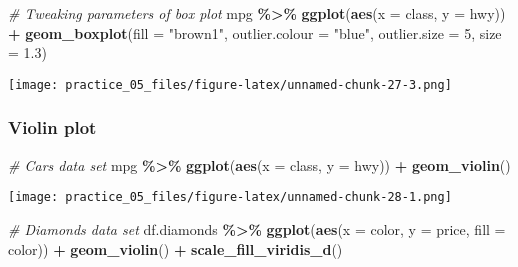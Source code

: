 \documentclass[
]{article}
\newenvironment{Shaded}{\begin{snugshade}}{\end{snugshade}}
\newcommand{\AttributeTok}[1]{\textcolor[rgb]{0.13,0.29,0.53}{#1}}
\newcommand{\CommentTok}[1]{\textcolor[rgb]{0.56,0.35,0.01}{\textit{#1}}}
\newcommand{\DecValTok}[1]{\textcolor[rgb]{0.00,0.00,0.81}{#1}}
\newcommand{\FloatTok}[1]{\textcolor[rgb]{0.00,0.00,0.81}{#1}}
\newcommand{\FunctionTok}[1]{\textcolor[rgb]{0.13,0.29,0.53}{\textbf{#1}}}
\newcommand{\NormalTok}[1]{#1}
\newcommand{\SpecialCharTok}[1]{\textcolor[rgb]{0.81,0.36,0.00}{\textbf{#1}}}
\newcommand{\StringTok}[1]{\textcolor[rgb]{0.31,0.60,0.02}{#1}}
\begin{document}
\begin{Shaded}
\begin{Highlighting}[]
\CommentTok{\# Tweaking parameters of box plot}
\NormalTok{  mpg }\SpecialCharTok{\%\textgreater{}\%} 
    \FunctionTok{ggplot}\NormalTok{(}\FunctionTok{aes}\NormalTok{(}\AttributeTok{x =}\NormalTok{ class,}
               \AttributeTok{y =}\NormalTok{ hwy)) }\SpecialCharTok{+}
    \FunctionTok{geom\_boxplot}\NormalTok{(}\AttributeTok{fill =} \StringTok{"brown1"}\NormalTok{, }
                 \AttributeTok{outlier.colour =} \StringTok{"blue"}\NormalTok{, }
                 \AttributeTok{outlier.size =} \DecValTok{5}\NormalTok{,}
                 \AttributeTok{size =} \FloatTok{1.3}\NormalTok{)}
\end{Highlighting}
\end{Shaded}

\texttt{[image: practice\_05\_files/figure-latex/unnamed-chunk-27-3.png]}

\subsubsection{Violin plot}\label{violin-plot}

\begin{Shaded}
\begin{Highlighting}[]
\CommentTok{\# Cars data set  }
\NormalTok{mpg }\SpecialCharTok{\%\textgreater{}\%}
  \FunctionTok{ggplot}\NormalTok{(}\FunctionTok{aes}\NormalTok{(}\AttributeTok{x =}\NormalTok{ class,}
             \AttributeTok{y =}\NormalTok{ hwy)) }\SpecialCharTok{+}
  \FunctionTok{geom\_violin}\NormalTok{()}
\end{Highlighting}
\end{Shaded}

\texttt{[image: practice\_05\_files/figure-latex/unnamed-chunk-28-1.png]}

\begin{Shaded}
\begin{Highlighting}[]
\CommentTok{\# Diamonds data set}
\NormalTok{df.diamonds }\SpecialCharTok{\%\textgreater{}\%} 
  \FunctionTok{ggplot}\NormalTok{(}\FunctionTok{aes}\NormalTok{(}\AttributeTok{x =}\NormalTok{ color,}
             \AttributeTok{y =}\NormalTok{ price,}
             \AttributeTok{fill =}\NormalTok{ color)) }\SpecialCharTok{+}
  \FunctionTok{geom\_violin}\NormalTok{() }\SpecialCharTok{+}
  \FunctionTok{scale\_fill\_viridis\_d}\NormalTok{()}
\end{Highlighting}
\end{Shaded}
\end{document}
